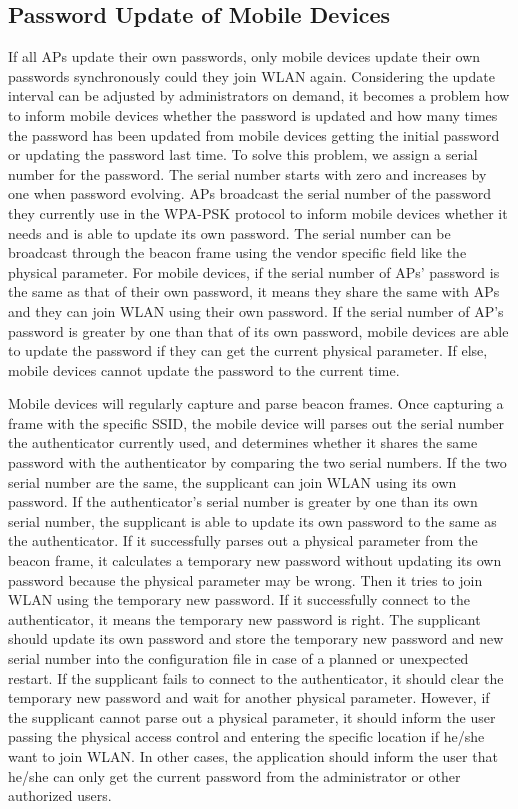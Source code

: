 \subsection{Password Update of Mobile Devices}
If all APs update their own passwords, only mobile devices update their own passwords synchronously could they join WLAN again. Considering the update interval can be adjusted by administrators on demand, it becomes a problem how to inform mobile devices whether the password is updated and how many times the password has been updated from mobile devices getting the initial password or updating the password last time. To solve this problem, we assign a serial number for the password. The serial number starts with zero and increases by one when password evolving. APs broadcast the serial number of the password they currently use in the WPA-PSK protocol to inform mobile devices whether it needs and is able to update its own password. The serial number can be broadcast through the beacon frame using the vendor specific field like the physical parameter. For mobile devices, if the serial number of APs’ password is the same as that of their own password, it means they share the same with APs and they can join WLAN using their own password. If the serial number of AP’s password is greater by one than that of its own password, mobile devices are able to update the password if they can get the current physical parameter. If else, mobile devices cannot update the password to the current time. 

Mobile devices will regularly capture and parse beacon frames. Once capturing a frame with the specific SSID, the mobile device will parses out the serial number the authenticator currently used, and determines whether it shares the same password with the authenticator by comparing the two serial numbers. If the two serial number are the same, the supplicant can join WLAN using its own password. If the authenticator’s serial number is greater by one than its own serial number, the supplicant is able to update its own password to the same as the authenticator. If it successfully parses out a physical parameter from the beacon frame, it calculates a temporary new password without updating its own password because the physical parameter may be wrong. Then it tries to join WLAN using the temporary new password. If it successfully connect to the authenticator, it means the temporary new password is right. The supplicant should update its own password and store the temporary new password and new serial number into the configuration file in case of a planned or unexpected restart. If the supplicant fails to connect to the authenticator, it should clear the temporary new password and wait for another physical parameter. However, if the supplicant cannot parse out a physical parameter, it should inform the user passing the physical access control and entering the specific location if he/she want to join WLAN. In other cases, the application should inform the user that he/she can only get the current password from the administrator or other authorized users. 

